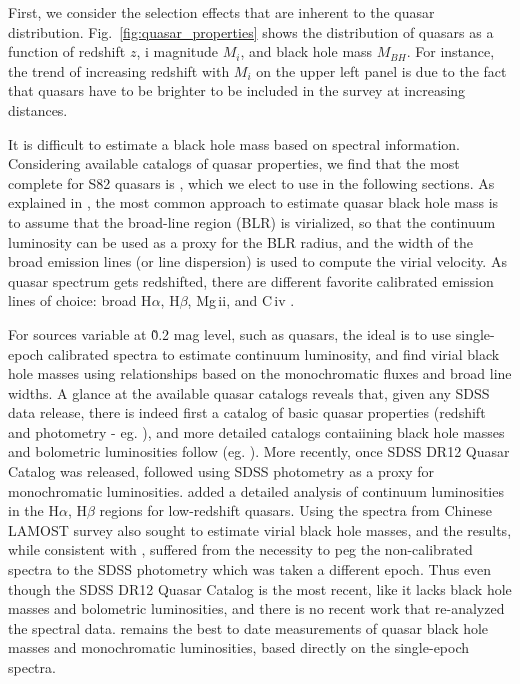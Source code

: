 \documentclass[twocolumn]{aastex62}
\begin{document}
First, we consider the selection effects that are inherent to the quasar distribution. Fig.~\ref{fig:quasar_properties} shows the distribution of quasars as a function of redshift $z$, i magnitude $M_{i}$, and black hole mass $M_{BH}$. For instance, the trend of increasing redshift with $M_{i}$ on the upper left panel is due to the fact that quasars have to be brighter to be included in the survey at increasing distances. 

It is difficult to estimate a black hole mass based on spectral information.  Considering  available catalogs of quasar properties,  we find that the most complete for S82 quasars is \cite{shen2011}, which we elect to use in the following sections. As explained in \citep{shen2008,shen2011}, the most common approach to estimate quasar black hole mass is to assume that the broad-line region (BLR) is virialized, so that the continuum luminosity can be used as a proxy for the BLR radius, and the width of the broad emission lines (or line dispersion) is used to compute the virial velocity. As quasar spectrum gets redshifted, there are different favorite calibrated  emission lines of choice: broad H$\alpha$, H$\beta$, Mg\,{\sc ii}, and C\,{\sc iv} \citep{vestergaard2002}.%

For sources variable at \~0.2 mag level, such as quasars, the ideal is to use single-epoch calibrated spectra to estimate continuum luminosity, and find virial black hole masses using relationships based on the monochromatic fluxes and broad line widths. A glance at the available quasar catalogs reveals that, given any SDSS data release, there is indeed first a catalog of basic quasar properties (redshift and photometry - eg. \citealt{schneider2007, schneider2010}), and more detailed catalogs contaiining black hole masses and bolometric luminosities  follow (eg. \citealt{shen2008, shen2011}). More recently, once SDSS DR12 Quasar Catalog \citep{paris2017} was released,  \citep{kozlowski2017a} followed using SDSS photometry as a proxy for monochromatic luminosities.\citep{chen2018} added a detailed analysis of continuum luminosities in the  H$\alpha$, H$\beta$ regions for low-redshift quasars. Using the spectra from Chinese LAMOST survey \citep{dong2018} also sought to estimate virial black hole masses, and the results, while consistent with \citep{shen2011}, suffered from the necessity to peg the non-calibrated spectra to the SDSS photometry which was taken  a different epoch. Thus even though the SDSS DR12 Quasar Catalog \cite{paris2018}  is the most recent, like \citep{paris2017} it lacks black hole masses and bolometric luminosities, and there is no recent work that re-analyzed the spectral data. \citep{shen2011} remains the best to date measurements of quasar black hole masses and monochromatic luminosities, based directly on the single-epoch spectra. 
\end{document}
